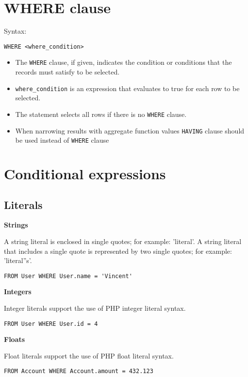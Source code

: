 \documentclass[11pt,a4paper]{report}
\begin{document}
\section{WHERE clause}
Syntax:

\begin{verbatim}
WHERE <where_condition>
\end{verbatim}

\begin{itemize}
\item{The \texttt{WHERE} clause, if given, indicates the condition or conditions that the records must satisfy to be selected.}
\item{\texttt{where\_condition} is an expression that evaluates to true for each row to be selected.}
\item{The statement selects all rows if there is no \texttt{WHERE} clause.}
\item{When narrowing results with aggregate function values \texttt{HAVING} clause should be used instead of \texttt{WHERE} clause}
\end{itemize}
\section{Conditional expressions}
\subsection{Literals}
\textbf{Strings}

A string literal is enclosed in single quotes; for example: 'literal'. A string literal that includes a single quote is represented by two single quotes; for example: 'literal''s'.

\begin{verbatim}
FROM User WHERE User.name = 'Vincent'
\end{verbatim}

\textbf{Integers}

Integer literals support the use of PHP integer literal syntax.

\begin{verbatim}
FROM User WHERE User.id = 4
\end{verbatim}

\textbf{Floats}

Float literals support the use of PHP float literal syntax.

\begin{verbatim}
FROM Account WHERE Account.amount = 432.123
\end{verbatim}
\end{document}
